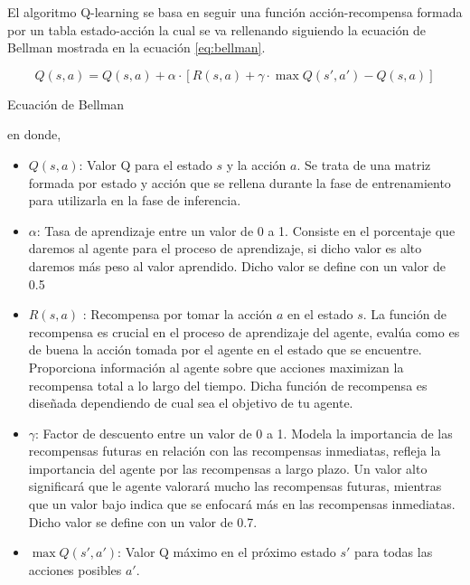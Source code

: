   El algoritmo Q-learning se basa en seguir una función acción-recompensa formada por un tabla estado-acción la cual se va rellenando siguiendo la ecuación
  de Bellman\cite{Bellman} mostrada en la ecuación \ref{eq:bellman}.
  \begin{myequation}[ht]
    \begin{equation}
      Q(s, a) = Q(s, a) + \alpha \cdot [R(s, a) + \gamma \cdot \max Q(s', a') - Q(s, a)]
      \label{eq:bellman}
    \end{equation}
    \caption{Ecuación de Bellman}
  \end{myequation}
  en donde, 
  \begin{itemize}
    \item \textbf{$Q(s, a)$}: Valor Q para el estado $s$ y la acción $a$. Se trata de una matriz formada por estado y acción que se rellena durante la fase de entrenamiento para utilizarla
    en la fase de inferencia.
    \item \textbf{$\alpha$}: Tasa de aprendizaje entre un valor de 0 a 1. Consiste en el porcentaje que daremos al agente para el proceso de aprendizaje, 
    si dicho valor es alto daremos más peso al valor aprendido. Dicho valor se define con un valor de 0.5 
    \item \textbf{$R(s, a)$ }: Recompensa por tomar la acción $a$ en el estado $s$. La función de recompensa es crucial en el proceso de aprendizaje del agente, 
    evalúa como es de buena la acción tomada por el agente en el estado que se encuentre. Proporciona información al agente sobre que acciones maximizan la recompensa total a lo largo del tiempo. Dicha función
    de recompensa es diseñada dependiendo de cual sea el objetivo de tu agente. 
    \item \textbf{$\gamma$}: Factor de descuento entre un valor de 0 a 1. Modela la importancia de las recompensas futuras en relación con las recompensas inmediatas, refleja la importancia del agente
    por las recompensas a largo plazo. Un valor alto significará que le agente valorará mucho las recompensas futuras, mientras que un valor bajo indica que se enfocará más en las recompensas
    inmediatas. Dicho valor se define con un valor de 0.7.
    \item \textbf{$\max Q(s', a')$}: Valor Q máximo en el próximo estado $s'$ para todas las acciones posibles $a'$.
\end{itemize}

